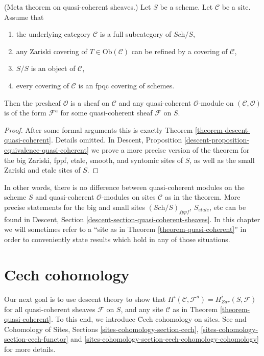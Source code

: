 \begin{theorem}
\label{theorem-quasi-coherent}
(Meta theorem on quasi-coherent sheaves.)
Let $S$ be a scheme.
Let $\mathcal{C}$ be a site. Assume that
\begin{enumerate}
\item the underlying category $\mathcal{C}$ is a
full subcategory of $\textit{Sch}/S$,
\item any Zariski covering of $T \in \text{Ob}(\mathcal{C})$
can be refined by a covering of $\mathcal{C}$,
\item $S/S$ is an object of $\mathcal{C}$,
\item every covering of $\mathcal{C}$ is an fpqc covering of schemes.
\end{enumerate}
Then the presheaf $\mathcal{O}$ is a sheaf on $\mathcal{C}$ and
any quasi-coherent $\mathcal{O}$-module on $(\mathcal{C}, \mathcal{O})$
is of the form $\mathcal{F}^a$ for some quasi-coherent sheaf
$\mathcal{F}$ on $S$.
\end{theorem}

\begin{proof}
After some formal arguments this is exactly Theorem
\ref{theorem-descent-quasi-coherent}. Details omitted. In
Descent, Proposition \ref{descent-proposition-equivalence-quasi-coherent}
we prove a more precise version of the theorem for the
big Zariski, fppf, etale, smooth, and syntomic sites of $S$,
as well as the small Zariski and etale sites of $S$.
\end{proof}

\noindent
In other words, there is no difference between quasi-coherent
modules on the scheme $S$ and quasi-coherent $\mathcal{O}$-modules
on sites $\mathcal{C}$ as in the theorem. More precise statements
for the big and small sites $(\textit{Sch}/S)_{fppf}$, $S_{etale}$, etc
can be found in
Descent, Section \ref{descent-section-quasi-coherent-sheaves}.
In this chapter we will sometimes refer to a
``site as in Theorem \ref{theorem-quasi-coherent}''
in order to conveniently state results which hold in any of those
situations.






\section{Cech cohomology}
\label{section-cech-cohomology}

\noindent
Our next goal is to use descent theory to show that
$H^i(\mathcal{C}, \mathcal{F}^a) = H_{Zar}^i(S, \mathcal{F})$
for all quasi-coherent sheaves $\mathcal{F}$ on $S$, and
any site $\mathcal{C}$ as in Theorem \ref{theorem-quasi-coherent}.
To this end, we introduce \u Cech cohomology on sites.
See \cite{ArtinTopologies} and
Cohomology of Sites, Sections \ref{sites-cohomology-section-cech},
\ref{sites-cohomology-section-cech-functor}
and \ref{sites-cohomology-section-cech-cohomology-cohomology}
for more details.

